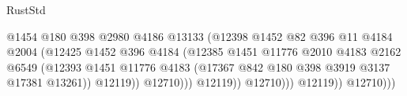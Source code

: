 \begin{lexlean}{RustStd}
\begin{coremodule}
                                                    @1454
                                                    @180
                                                    @398
                                                    @2980
                                                    @4186
                                                    @13133
                                                    (@12398
                                                      @1452
                                                      @82
                                                      @396
                                                      @11
                                                      @4184
                                                      @2004
                                                      (@12425
                                                        @1452
                                                        @396
                                                        @4184
                                                        (@12385
                                                          @1451
                                                          @11776
                                                          @2010
                                                          @4183
                                                          @2162
                                                          @6549
                                                          (@12393
                                                            @1451
                                                            @11776
                                                            @4183
                                                            (@17367
                                                              @842
                                                              @180
                                                              @398
                                                              @3919
                                                              @3137
                                                              @17381
                                                              @13261))
                                                          @12119))
                                                      @12710)))
                                                @12119))
                                            @12710)))
                                      @12119))
                                  @12710)))

\end{coremodule}
\end{lexlean}
